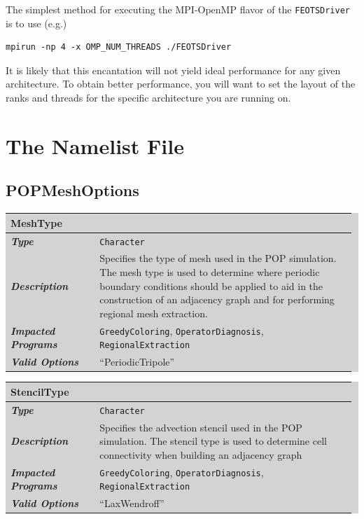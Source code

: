 \documentclass{softwaremanual}
\begin{document}
The simplest method for executing the MPI-OpenMP flavor of the \texttt{FEOTSDriver} is to use (e.g.)
\begin{verbatim}
mpirun -np 4 -x OMP_NUM_THREADS ./FEOTSDriver
\end{verbatim}
It is likely that this encantation will not yield ideal performance for any given architecture. To obtain better performance, you will want to set the layout of the ranks and threads for the specific architecture you are running on.


\section{The Namelist File}

\subsection{POPMeshOptions} \label{sec:POPMeshOptions}

\begingroup\setlength{\fboxsep}{0pt}
  \colorbox{lightgray}{
    \begin{tabular}{p{0.25\linewidth} p{0.725\linewidth}}
    \toprule
    \textbf{MeshType} & \\
    \midrule
    \textbf{\textit{Type}} & \texttt{Character} \\
    \midrule
    \textbf{\textit{Description}} & Specifies the type of mesh used in the POP simulation. The mesh type is used to determine where periodic boundary conditions should be applied to aid in the construction of an adjacency graph and for performing regional mesh extraction. \\
    \midrule
    \textbf{\textit{Impacted Programs}} & \texttt{GreedyColoring}, \texttt{OperatorDiagnosis}, \texttt{RegionalExtraction} \\
    \midrule
    \textbf{\textit{Valid Options}}  & ``PeriodicTripole'' \\
    \bottomrule
\end{tabular}
}\endgroup


\noindent\begingroup\setlength{\fboxsep}{0pt}
\colorbox{lightgray}{
\begin{tabular}{p{0.25\linewidth} p{0.725\linewidth}}
\toprule
\textbf{StencilType} & \\
\midrule
\textbf{\textit{Type}} & \texttt{Character} \\
\midrule
\textbf{\textit{Description}} & Specifies the advection stencil used in the POP simulation. The stencil type is used to determine cell connectivity when building an adjacency graph  \\
\midrule
\textbf{\textit{Impacted Programs}} & \texttt{GreedyColoring}, \texttt{OperatorDiagnosis}, \texttt{RegionalExtraction} \\
\midrule
\textbf{\textit{Valid Options}}  & ``LaxWendroff'' \\
\bottomrule
\end{tabular}
}\endgroup
\end{document}
